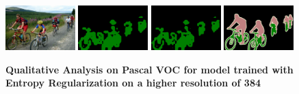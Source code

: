 \begin{figure}[t]
  {\includegraphics[width=0.24\textwidth]{figures/experiments/pascal/image/0039.jpg}}
  {\includegraphics[width=0.24\textwidth]{figures/experiments/pascal/ft/0039.png}}
  {\includegraphics[width=0.24\textwidth]{figures/experiments/pascal/highres+ge/0039.png}}
  {\includegraphics[width=0.24\textwidth]{figures/experiments/pascal/gt/2007_001311.png}}
\caption[\textbf{Qualitative Analysis on Pascal VOC for model trained with Entropy Regularization}]{\textbf{Qualitative Analysis on Pascal VOC for model trained with Entropy Regularization on a higher resolution of 384}}
\label{fig:qualitative_hrge}
\end{figure}


